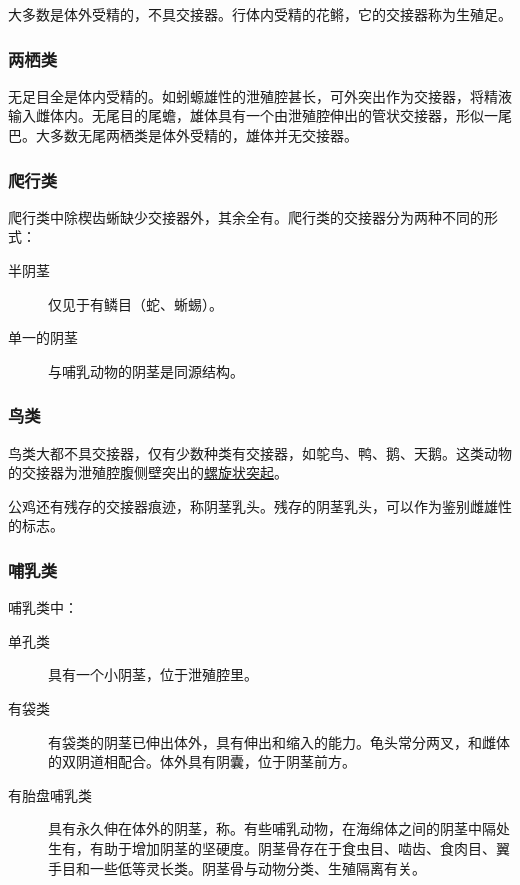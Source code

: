 大多数是体外受精的，不具交接器。行体内受精的花鳉，它的交接器称为生殖足。

\subsubsection{两栖类}

无足目全是体内受精的。如蚓螈雄性的泄殖腔甚长，可外突出作为交接器，将精液输入雌体内。无尾目的尾蟾，雄体具有一个由泄殖腔伸出的管状交接器，形似一尾巴。大多数无尾两栖类是体外受精的，雄体并无交接器。

\subsubsection{爬行类}

爬行类中除楔齿蜥缺少交接器外，其余全有。爬行类的交接器分为两种不同的形式：

\begin{description}
	\item[半阴茎] 仅见于有鳞目（蛇、蜥蜴）。
	\item[单一的阴茎] 与哺乳动物的阴茎是同源结构。
\end{description}

\subsubsection{鸟类}

鸟类大都不具交接器，仅有少数种类有交接器，如鸵鸟、鸭、鹅、天鹅。这类动物的交接器为泄殖腔腹侧壁突出的\uline{螺旋状突起}。

公鸡还有残存的交接器痕迹，称阴茎乳头。残存的阴茎乳头，可以作为鉴别雌雄性的标志。

\subsubsection{哺乳类}

哺乳类中：

\begin{description}
	\item[单孔类] 具有一个小阴茎，位于泄殖腔里。
	\item[有袋类] 有袋类的阴茎已伸出体外，具有伸出和缩入的能力。龟头常分两叉，和雌体的双阴道相配合。体外具有阴囊，位于阴茎前方。
	\item[有胎盘哺乳类] 具有永久伸在体外的阴茎，称。有些哺乳动物，在海绵体之间的阴茎中隔处生有，有助于增加阴茎的坚硬度。阴茎骨存在于食虫目、啮齿、食肉目、翼手目和一些低等灵长类。阴茎骨与动物分类、生殖隔离有关。
\end{description}

